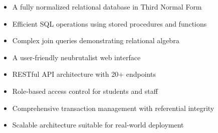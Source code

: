 \documentclass[12pt,a4paper]{article}
\begin{document}
\begin{itemize}
    \item A fully normalized relational database in Third Normal Form
    \item Efficient SQL operations using stored procedures and functions
    \item Complex join queries demonstrating relational algebra
    \item A user-friendly neubrutalist web interface
    \item RESTful API architecture with 20+ endpoints
    \item Role-based access control for students and staff
    \item Comprehensive transaction management with referential integrity
    \item Scalable architecture suitable for real-world deployment
\end{itemize}
\end{document}
